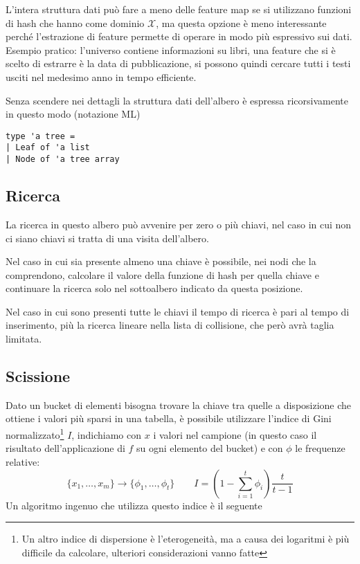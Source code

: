 \documentclass[a4paper]{article}
\begin{document}
L'intera struttura dati può fare a meno delle feature map se si utilizzano funzioni di hash che hanno come dominio $\mathcal{X}$, ma questa opzione è meno interessante perché l'estrazione di feature permette di operare in modo più espressivo sui dati. Esempio pratico: l'universo contiene informazioni su libri, una feature che si è scelto di estrarre è la data di pubblicazione, si possono quindi cercare tutti i testi usciti nel medesimo anno in tempo efficiente.

Senza scendere nei dettagli la struttura dati dell'albero è espressa ricorsivamente in questo modo (notazione ML)
\begin{verbatim}
type 'a tree =
| Leaf of 'a list
| Node of 'a tree array
\end{verbatim}

\subsection*{Ricerca}

La ricerca in questo albero può avvenire per zero o più chiavi, nel caso in cui non ci siano chiavi si tratta di una visita dell'albero.

Nel caso in cui sia presente almeno una chiave è possibile, nei nodi che la comprendono, calcolare il valore della funzione di hash per quella chiave e continuare la ricerca solo nel sottoalbero indicato da questa posizione.

Nel caso in cui sono presenti tutte le chiavi il tempo di ricerca è pari al tempo di inserimento, più la ricerca lineare nella lista di collisione, che però avrà taglia limitata.

\subsection*{Scissione}
Dato un bucket di elementi bisogna trovare la chiave tra quelle a disposizione che ottiene i valori più sparsi in una tabella, è possibile utilizzare l'indice di Gini normalizzato\footnote{Un altro indice di dispersione è l'eterogeneità, ma a causa dei logaritmi è più difficile da calcolare, ulteriori considerazioni vanno fatte} $I$, indichiamo con $x$ i valori nel campione (in questo caso il risultato dell'applicazione di $f$ su ogni elemento del bucket) e con $\phi$ le frequenze relative:
$$ \{ x_1, \ldots, x_m \} \rightarrow \{ \phi_1, \ldots, \phi_t \} \qquad I = \left( 1 - \sum_{i=1}^{t}\phi_i \right) \frac{t}{t - 1} $$
Un algoritmo ingenuo che utilizza questo indice è il seguente
\end{document}
